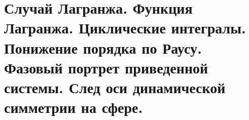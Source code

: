 \section{Случай Лагранжа. Функция Лагранжа. Циклические интегралы. Понижение порядка по Раусу. Фазовый портрет приведенной системы. След оси динамической симметрии на сфере.}\label{chasec16}



\newpage